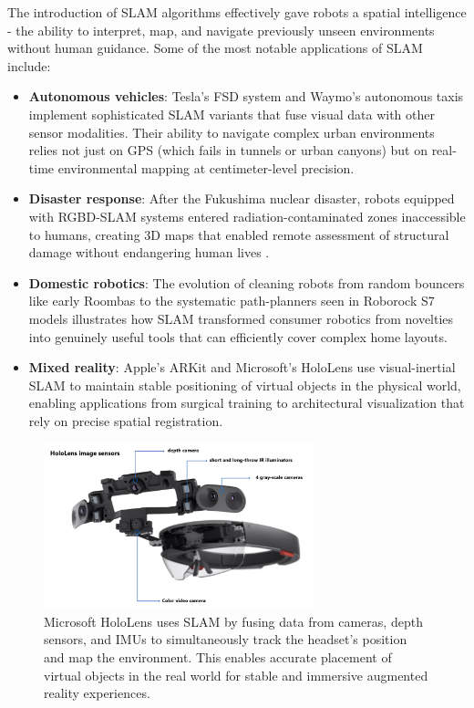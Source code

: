 \documentclass[12pt]{article}
\begin{document}
    The introduction of SLAM algorithms effectively gave robots a spatial intelligence - the ability to interpret, map, and navigate previously unseen environments without human guidance.
    Some of the most notable applications of SLAM include:
    \begin{itemize}
        \item \textbf{Autonomous vehicles}: Tesla's FSD system and Waymo's autonomous taxis implement sophisticated SLAM variants that fuse visual data with other sensor modalities. 
        Their ability to navigate complex urban environments relies not just on GPS (which fails in tunnels or urban canyons) but on real-time environmental mapping at centimeter-level precision.
        \item \textbf{Disaster response}: After the Fukushima nuclear disaster, robots equipped with RGBD-SLAM systems entered radiation-contaminated zones inaccessible to humans,
        creating 3D maps that enabled remote assessment of structural damage without endangering human lives \cite{fukushima_disaster}.
        \item \textbf{Domestic robotics}: The evolution of cleaning robots from random bouncers like early Roombas to the systematic path-planners seen in Roborock S7 models 
        illustrates how SLAM transformed consumer robotics from novelties into genuinely useful tools that can efficiently cover complex home layouts.
        \item \textbf{Mixed reality}: Apple's ARKit and Microsoft's HoloLens use visual-inertial SLAM to maintain stable positioning of virtual objects in the physical world, enabling 
        applications from surgical training to architectural visualization that rely on precise spatial registration.
    \end{itemize}

    \begin{figure}[h!]
        \centering
        \includegraphics[width=0.7\textwidth]{mcsft_hololens.png}
        \caption{Microsoft HoloLens uses SLAM by fusing data from cameras, depth sensors, and IMUs to simultaneously track the headset’s position and map the environment. 
        This enables accurate placement of virtual objects in the real world for stable and immersive augmented reality experiences.}
        \label{fig:mcsft_hololens}
    \end{figure}
\end{document}
